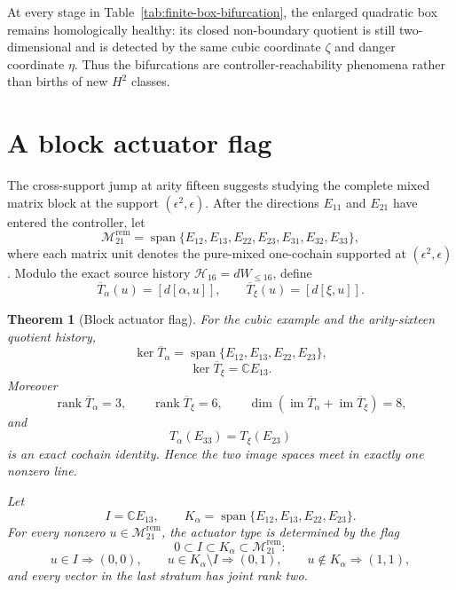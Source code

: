 \documentclass[11pt]{amsart}
\newtheorem{theorem}{Theorem}[section]
\newcommand{\Span}{\operatorname{span}}
\newcommand{\rank}{\operatorname{rank}}
\newcommand{\C}{\mathbb C}
\begin{document}
At every stage in Table~\ref{tab:finite-box-bifurcation}, the enlarged quadratic box remains homologically healthy: its closed non-boundary quotient is still two-dimensional and is detected by the same cubic coordinate $\zeta$ and danger coordinate $\eta$.  Thus the bifurcations are controller-reachability phenomena rather than births of new $H^2$ classes.

\section{A block actuator flag}\label{sec:block-flag}

The cross-support jump at arity fifteen suggests studying the complete mixed matrix block at the support $(\epsilon^2,\epsilon)$.  After the directions $E_{11}$ and $E_{21}$ have entered the controller, let
\[
\mathcal M_{21}^{\mathrm{rem}}
=
\Span\{E_{12},E_{13},E_{22},E_{23},E_{31},E_{32},E_{33}\},
\]
where each matrix unit denotes the pure-mixed one-cochain supported at $(\epsilon^2,\epsilon)$.  Modulo the exact source history $\mathcal H_{16}=dW_{\le16}$, define
\[
\overline T_\alpha(u)=[d[\alpha,u]],
\qquad
\overline T_\xi(u)=[d[\xi,u]].
\]

\begin{theorem}[Block actuator flag]\label{thm:block-actuator-flag}
For the cubic example and the arity-sixteen quotient history,
\[
\ker\overline T_\alpha
=
\Span\{E_{12},E_{13},E_{22},E_{23}\},
\]
\[
\ker\overline T_\xi
=
\C E_{13}.
\]
Moreover
\[
\rank\overline T_\alpha=3,
\qquad
\rank\overline T_\xi=6,
\qquad
\dim(\operatorname{im}\overline T_\alpha+
     \operatorname{im}\overline T_\xi)=8,
\]
and
\begin{equation}\label{eq:block-intersection}
\boxed{
T_\alpha(E_{33})=T_\xi(E_{23})
}
\end{equation}
is an exact cochain identity.  Hence the two image spaces meet in exactly one nonzero line.

Let
\[
I=\C E_{13},
\qquad
K_\alpha=\Span\{E_{12},E_{13},E_{22},E_{23}\}.
\]
For every nonzero $u\in\mathcal M_{21}^{\mathrm{rem}}$, the actuator type is determined by the flag
\[
0\subset I\subset K_\alpha\subset\mathcal M_{21}^{\mathrm{rem}}:
\]
\[
u\in I\Longrightarrow(0,0),
\qquad
u\in K_\alpha\setminus I\Longrightarrow(0,1),
\qquad
u\notin K_\alpha\Longrightarrow(1,1),
\]
and every vector in the last stratum has joint rank two.
\end{theorem}
\end{document}
